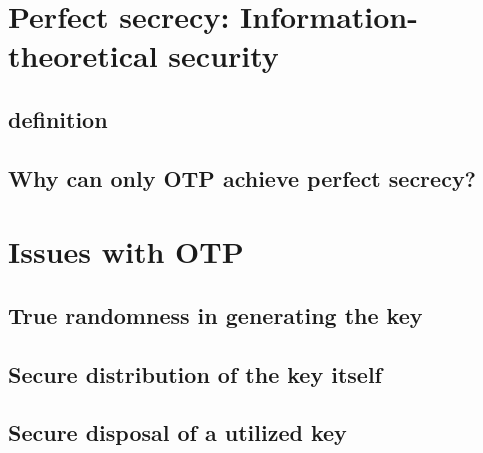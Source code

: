 \documentclass[12pt]{report}
\begin{document}
\section{Perfect secrecy: Information-theoretical security}

\subsection{definition}


\subsection{Why can only OTP achieve perfect secrecy?}

\section{Issues with OTP}

\subsection{True randomness in generating the key}

\subsection{Secure distribution of the key itself}

\subsection{Secure disposal of a utilized key}


\printbibliography
\end{document}
